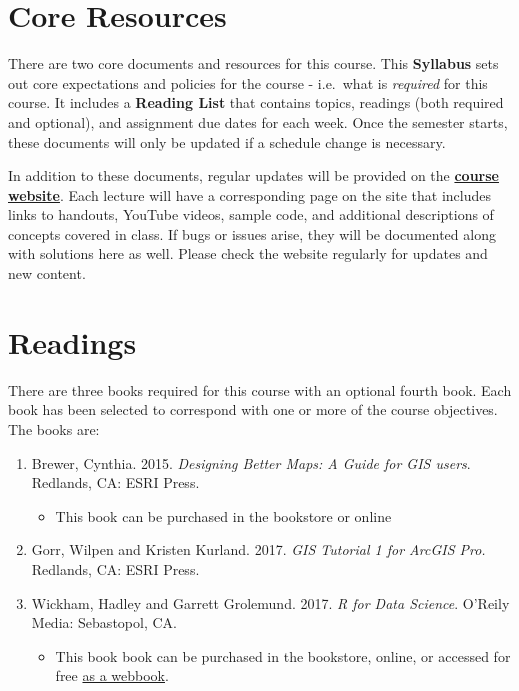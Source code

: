 \documentclass[]{book}
\providecommand{\tightlist}{%
  \setlength{\itemsep}{0pt}\setlength{\parskip}{0pt}}
\begin{document}
\hypertarget{core-resources}{%
\section{Core Resources}\label{core-resources}}

There are two core documents and resources for this course. This \textbf{Syllabus} sets out core expectations and policies for the course - i.e.~what is \emph{required} for this course. It includes a \textbf{Reading List} that contains topics, readings (both required and optional), and assignment due dates for each week. Once the semester starts, these documents will only be updated if a schedule change is necessary.

In addition to these documents, regular updates will be provided on the \href{https://slu-soc5650.github.io}{\textbf{course website}}. Each lecture will have a corresponding page on the site that includes links to handouts, YouTube videos, sample code, and additional descriptions of concepts covered in class. If bugs or issues arise, they will be documented along with solutions here as well. Please check the website regularly for updates and new content.

\hypertarget{readings}{%
\section{Readings}\label{readings}}

There are three books required for this course with an optional fourth book. Each book has been selected to correspond with one or more of the course objectives. The books are:

\begin{enumerate}
\def\labelenumi{\arabic{enumi}.}
\tightlist
\item
  Brewer, Cynthia. 2015. \emph{Designing Better Maps: A Guide for GIS users}. Redlands, CA: ESRI Press.

  \begin{itemize}
  \tightlist
  \item
    This book can be purchased in the bookstore or online
  \end{itemize}
\item
  Gorr, Wilpen and Kristen Kurland. 2017. \emph{GIS Tutorial 1 for ArcGIS Pro.} Redlands, CA: ESRI Press.
\item
  Wickham, Hadley and Garrett Grolemund. 2017. \emph{R for Data Science}. O'Reily Media: Sebastopol, CA.

  \begin{itemize}
  \tightlist
  \item
    This book book can be purchased in the bookstore, online, or accessed for free \href{http://r4ds.had.co.nz}{as a webbook}.
  \end{itemize}
\end{enumerate}
\end{document}
